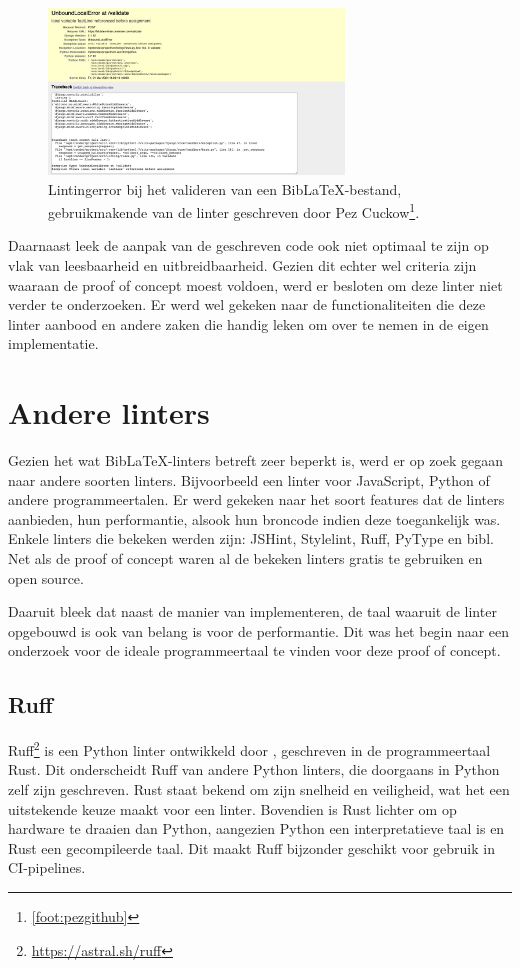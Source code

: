 \begin{figure}[ht]
    \centering
    \includegraphics[width=0.7\textwidth]{./files/Pezmc-LinterError_cropped.png}
    \caption[Foutmelding BibLaTeX-linter]{Lintingerror bij het valideren van een BibLaTeX-bestand, gebruikmakende van de linter geschreven door Pez Cuckow\footnote[1]{\ref{foot:pezgithub}}.}
    \label{fig:biblatex-linter-error}
\end{figure}

Daarnaast leek de aanpak van de geschreven code ook niet optimaal te zijn op vlak van leesbaarheid en uitbreidbaarheid. Gezien dit echter wel criteria zijn waaraan de proof of concept moest voldoen, werd er besloten om deze linter niet verder te onderzoeken. Er werd wel gekeken naar de functionaliteiten die deze linter aanbood en andere zaken die handig leken om over te nemen in de eigen implementatie.

\section{Andere linters}
Gezien het wat BibLaTeX-linters betreft zeer beperkt is, werd er op zoek gegaan naar andere soorten linters. Bijvoorbeeld een linter voor JavaScript, Python of andere programmeertalen. Er werd gekeken naar het soort features dat de linters aanbieden, hun performantie, alsook hun broncode indien deze toegankelijk was. Enkele linters die bekeken werden zijn: JSHint, Stylelint, Ruff, PyType en bibl. Net als de proof of concept waren al de bekeken linters gratis te gebruiken en open source.

Daaruit bleek dat naast de manier van implementeren, de taal waaruit de linter opgebouwd is ook van belang is voor de performantie. Dit was het begin naar een onderzoek voor de ideale programmeertaal te vinden voor deze proof of concept.

\subsection{Ruff}
Ruff\footnote{\url{https://astral.sh/ruff}} is een Python linter ontwikkeld door \textcite{Astral2024}, geschreven in de programmeertaal Rust. Dit onderscheidt Ruff van andere Python linters, die doorgaans in Python zelf zijn geschreven. Rust staat bekend om zijn snelheid en veiligheid, wat het een uitstekende keuze maakt voor een linter. Bovendien is Rust lichter om op hardware te draaien dan Python, aangezien Python een interpretatieve taal is en Rust een gecompileerde taal. Dit maakt Ruff bijzonder geschikt voor gebruik in CI-pipelines.

